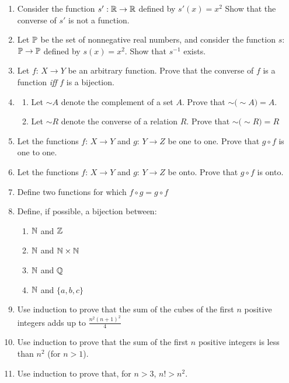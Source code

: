 \begin{enumerate}[{0.}1. ]
\item
Consider the function $s': \mathbb{R} \rightarrow \mathbb{R}$ defined by $s'(x) = x^2$ Show
that the converse of $s'$ is not a function.

\item
Let $\mathbb{P}$ be the set of nonnegative real numbers, and consider the function
$s$: $\mathbb{P} \rightarrow \mathbb{P}$ defined by $s(x)=x^2$. Show that $s^{-1}$ exists.

\item
Let $f$: $X \rightarrow Y$ be an arbitrary function. Prove that the converse of $f$ is
a function \emph{iff} $f$ is a bijection.

\item
\begin{enumerate}
\item
Let $\sim$$A$ denote the complement of a set $A$. Prove that $\sim$$(\sim$$A) = A$.
\item
Let $\sim$$R$ denote the converse of a relation $R$. Prove that $\sim$$(\sim$$R) = R$
\end{enumerate}

\item
Let the functions $f$: $X \rightarrow Y$ and $g$: $Y \rightarrow Z$ be one to one.
Prove that $g \circ f$ is one to one.

\item
Let the functions $f$: $X \rightarrow Y$ and $g$: $Y \rightarrow Z$ be onto. Prove
that $g \circ f$ is onto.

\item
Define two functions for which $f\circ g = g\circ f$

\item
Define, if possible, a bijection between:
\begin{enumerate}
\item
$\mathbb{N}$ and $\mathbb{Z}$
\item
$\mathbb{N}$ and $\mathbb{N} \times \mathbb{N}$
\item
$\mathbb{N}$ and $\mathbb{Q}$
\item
$\mathbb{N}$ and $\{a, b, c\}$
\end{enumerate}

\item
Use induction to prove that the sum of the cubes of the first $n$ positive
integers adds up to $\frac{n^2(n + 1)^2}{4}$

\item
Use induction to prove that the sum of the first $n$ positive integers is less
than $n^2$ (for $n > 1$).

\item
Use induction to prove that, for $n > 3$, $n! > n^2$.


\end{enumerate}
